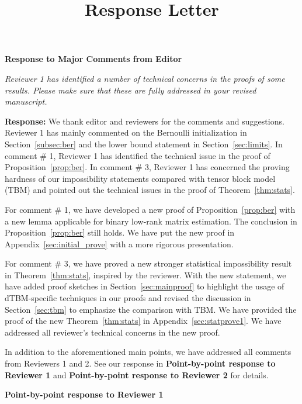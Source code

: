 \documentclass[11pt]{article}
\title{\textbf{Response Letter}}
\date{}
\theoremstyle{definition}
\theoremstyle{definition}
\begin{document}
\maketitle

\begin{center}
    \textbf{Response to Major Comments from Editor}
\end{center}

\textit{Reviewer 1 has identiﬁed a number of technical concerns in the proofs of some results. Please make sure that these are fully addressed in your revised manuscript.}

\textbf{Response:} We thank editor and reviewers for the comments and suggestions. Reviewer 1 has mainly commented on the Bernoulli initialization in Section~\ref{subsec:ber} and the lower bound statement in Section~\ref{sec:limits}. In comment \# 1, Reviewer 1 has identified the technical issue in the proof of Proposition~\ref{prop:ber}.  In comment \# 3, Reviewer 1 has concerned the proving hardness of our impossibility statements compared with tensor block model (TBM) and pointed out the technical issues in the proof of Theorem~\ref{thm:stats}.

 For comment \# 1, we have developed a new proof of Proposition~\ref{prop:ber} with a new lemma applicable for binary low-rank matrix estimation. The conclusion in Proposition~\ref{prop:ber} still holds. We have put the new proof in Appendix~\ref{sec:initial_prove} with a more rigorous presentation.
 
 For comment \# 3, we have proved a new stronger statistical impossibility result in Theorem~\ref{thm:stats}, inspired by the reviewer. With the new statement, we have added proof sketches in Section~\ref{sec:mainproof} to highlight the usage of dTBM-specific techniques in our proofs and revised the discussion in Section~\ref{sec:tbm} to emphasize the comparison with TBM. We have provided the proof of the new Theorem~\ref{thm:stats} in Appendix~\ref{sec:statprove1}. We have addressed all reviewer's technical concerns in the new proof. 
 
 In addition to the aforementioned main points, we have addressed all comments from Reviewers 1 and 2. See our response in \textbf{Point-by-point response to Reviewer 1} and \textbf{Point-by-point response to Reviewer 2} for details.

\newpage
\begin{center}
    \textbf{Point-by-point response to Reviewer 1}
\end{center}
\end{document}
